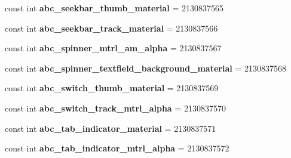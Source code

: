 \begin{DoxyCompactItemize}
const int {\bfseries abc\+\_\+seekbar\+\_\+thumb\+\_\+material} = 2130837565
\item 
\mbox{\label{class_sample_app_1_1_droid_1_1_resource_1_1_drawable_a431eb1555254050cb86a54564d4c7b2c}} 
const int {\bfseries abc\+\_\+seekbar\+\_\+track\+\_\+material} = 2130837566
\item 
\mbox{\label{class_sample_app_1_1_droid_1_1_resource_1_1_drawable_a5efee9972d51e9e1a9e5592a50253229}} 
const int {\bfseries abc\+\_\+spinner\+\_\+mtrl\+\_\+am\+\_\+alpha} = 2130837567
\item 
\mbox{\label{class_sample_app_1_1_droid_1_1_resource_1_1_drawable_a2d2f61665071743faf1583948687bb73}} 
const int {\bfseries abc\+\_\+spinner\+\_\+textfield\+\_\+background\+\_\+material} = 2130837568
\item 
\mbox{\label{class_sample_app_1_1_droid_1_1_resource_1_1_drawable_ae8e2d5fe5c53d8bf707c6f3530ec9641}} 
const int {\bfseries abc\+\_\+switch\+\_\+thumb\+\_\+material} = 2130837569
\item 
\mbox{\label{class_sample_app_1_1_droid_1_1_resource_1_1_drawable_a070a554cf5232320fcfc5a8e8168a95b}} 
const int {\bfseries abc\+\_\+switch\+\_\+track\+\_\+mtrl\+\_\+alpha} = 2130837570
\item 
\mbox{\label{class_sample_app_1_1_droid_1_1_resource_1_1_drawable_ad5ac6b255af575127e27461b52983082}} 
const int {\bfseries abc\+\_\+tab\+\_\+indicator\+\_\+material} = 2130837571
\item 
\mbox{\label{class_sample_app_1_1_droid_1_1_resource_1_1_drawable_adb6e7bc4b47eaf3671ab9041365899e0}} 
const int {\bfseries abc\+\_\+tab\+\_\+indicator\+\_\+mtrl\+\_\+alpha} = 2130837572
\item 
\mbox{\label{class_sample_app_1_1_droid_1_1_resource_1_1_drawable_ab8f55e820af7cd8a7702938940874895}} 

\end{DoxyCompactItemize}

